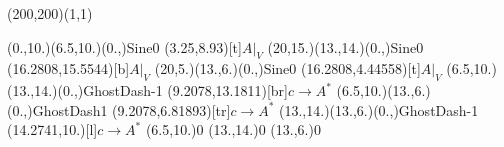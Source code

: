 \unitlength=1bp%

\begin{feynartspicture}(200,200)(1,1)

\FADiagram{}
\FAProp(0.,10.)(6.5,10.)(0.,){Sine}{0}
\FALabel(3.25,8.93)[t]{$A|_V$}
\FAProp(20,15.)(13.,14.)(0.,){Sine}{0}
\FALabel(16.2808,15.5544)[b]{$A|_V$}
\FAProp(20,5.)(13.,6.)(0.,){Sine}{0}
\FALabel(16.2808,4.44558)[t]{$A|_V$}
\FAProp(6.5,10.)(13.,14.)(0.,){GhostDash}{-1}
\FALabel(9.2078,13.1811)[br]{$c\to A^*$}
\FAProp(6.5,10.)(13.,6.)(0.,){GhostDash}{1}
\FALabel(9.2078,6.81893)[tr]{$c\to A^*$}
\FAProp(13.,14.)(13.,6.)(0.,){GhostDash}{-1}
\FALabel(14.2741,10.)[l]{$c\to A^*$}
\FAVert(6.5,10.){0}
\FAVert(13.,14.){0}
\FAVert(13.,6.){0}
\end{feynartspicture}

